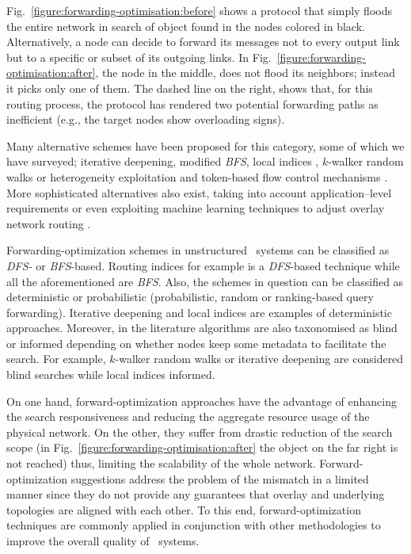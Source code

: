 Fig.~\ref{figure:forwarding-optimisation:before} 
shows a protocol that simply floods the entire network 
in search of object found in the nodes colored in black.
Alternatively, a node can decide to forward its
messages not to every output link but to a specific 
or subset of its outgoing links.
In Fig.~\ref{figure:forwarding-optimisation:after}, 
the node in the middle, does not flood its neighbors; instead 
it picks only one of them.
The dashed line on the right, shows that, 
for this routing process, the protocol has
rendered two potential forwarding paths as inefficient (e.g., the target nodes
show overloading signs).

Many alternative schemes have been proposed for this category, some of which we
have surveyed; iterative deepening, modified \emph{BFS}, local indices \cite{YG-M2002},
$k$-walker random walks \cite{LCCLS2002} or heterogeneity exploitation and
token-based flow control mechanisms \cite{CRBLS2003}. More sophisticated
alternatives also exist, taking into account application--level requirements
or even exploiting machine learning techniques to adjust overlay network
routing \cite{BFLZ2003}.

Forwarding-optimization schemes in unstructured \p\ systems can be classified
as \emph{DFS-} or \emph{BFS}-based. Routing indices \cite{CG-M2002} for example is a
\emph{DFS}-based technique while all the aforementioned are \emph{BFS}. Also,
the schemes in question can
be classified as deterministic or probabilistic (probabilistic, random or
ranking-based query forwarding). Iterative deepening and local indices
\cite{YG-M2002} are examples of deterministic approaches. Moreover, in the
literature algorithms are also taxonomised as blind or informed depending on
whether nodes keep some metadata to facilitate the search. For example,
$k$-walker random walks or iterative deepening are considered blind searches
while local indices informed.

On one hand, forward-optimization approaches have 
the advantage of enhancing the
search responsiveness and reducing the aggregate resource 
usage of the physical network. On the other, 
they suffer from drastic reduction of the search
scope (in Fig.~\ref{figure:forwarding-optimisation:after} the object on
the far right is not reached) thus, limiting the scalability of the whole
network. 
Forward-optimization suggestions address the problem of the mismatch 
in a limited manner since they do not provide any guarantees 
that overlay and underlying topologies are
aligned with each other.
To this end, forward-optimization techniques are commonly applied in
conjunction with other methodologies to improve 
the overall quality of \p\ systems.


